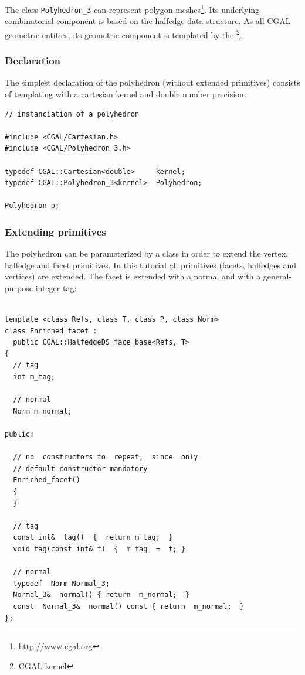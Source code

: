 
The class \verb+Polyhedron_3+ can represent polygon
meshes\footnote{\href{http://www.cgal.org/Manual/doc_html/basic_lib/Polyhedron_ref/Class_Polyhedron_3.html}{http://www.cgal.org}}.
Its underlying combinatorial component is based on the halfedge data
structure. As all CGAL geometric entities, its geometric component is
templated by the
\footnote{\href{http://www.CGAL.org/Manual/doc_html/frameset/fsKernel.html}{CGAL kernel}}.

\subsubsection{Declaration}

The simplest declaration of the polyhedron (without extended
primitives) consists of templating with a cartesian kernel and double
number precision:

{ \scriptsize
\begin{verbatim}
// instanciation of a polyhedron

#include <CGAL/Cartesian.h>
#include <CGAL/Polyhedron_3.h>

typedef CGAL::Cartesian<double>     kernel;
typedef CGAL::Polyhedron_3<kernel>  Polyhedron;

Polyhedron p;
\end{verbatim}}

\subsubsection{Extending primitives}

The polyhedron can be parameterized by a  class in
order to extend the vertex, halfedge and facet primitives. In this
tutorial all primitives (facets, halfedges and vertices) are
extended. The facet is extended with a normal and with a
general-purpose integer tag:

{ \scriptsize
\begin{verbatim}

template <class	Refs, class T, class P, class Norm>
class Enriched_facet : 
  public CGAL::HalfedgeDS_face_base<Refs, T>
{
  // tag
  int m_tag;

  // normal
  Norm m_normal;

public:

  // no  constructors to  repeat,  since  only
  // default constructor mandatory
  Enriched_facet()
  {
  }

  // tag
  const int&  tag()  {  return m_tag;  }
  void tag(const int& t)  {  m_tag  =  t; }

  // normal
  typedef  Norm Normal_3;
  Normal_3&  normal() { return  m_normal;  }
  const  Normal_3&  normal() const { return  m_normal;  }
};
\end{verbatim}}

